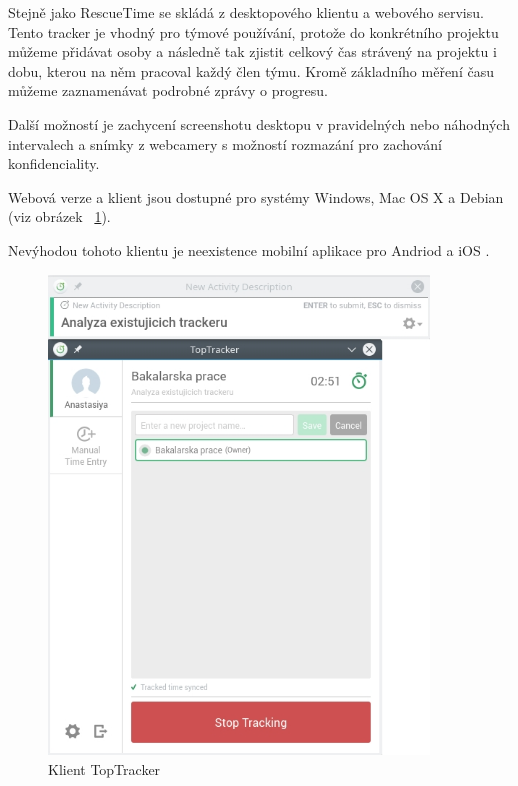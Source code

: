 \documentclass[thesis=B,czech]{FITthesis}[2012/06/26]
\begin{document}
Stejně jako RescueTime se skládá z desktopového klientu a webového servisu. Tento tracker je vhodný pro týmové používání, protože do konkrétního projektu můžeme přidávat osoby a následně tak zjistit celkový čas strávený na projektu i dobu, kterou na něm pracoval každý člen týmu. Kromě základního měření času můžeme zaznamenávat podrobné zprávy o progresu.
\par
Další možností je zachycení screenshotu desktopu v pravidelných nebo náhodných intervalech a snímky z webcamery s možností rozmazání pro zachování konfidenciality.
\par
Webová verze a klient jsou dostupné pro systémy Windows, Mac OS X a Debian (viz obrázek ~\ref{fig:toptracker}).
\par
Nevýhodou tohoto klientu je neexistence mobilní aplikace pro Andriod a iOS \cite{toptracker}.
\par
\begin{figure}[h]\centering
	\includegraphics[width=0.9\textwidth]{toptracker.jpg}
	\caption[Klient TopTracker]{Klient TopTracker}\label{fig:toptracker}
\end{figure}
\end{document}
